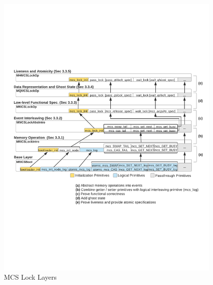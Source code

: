 \begin{figure}
\begin{center}
\includegraphics[width=\textwidth]{figs/mcslock/layer_overview}
\end{center}
\caption{MCS Lock Layers}
\label{fig:chapter:mcslock:layeroverview}
\end{figure}

